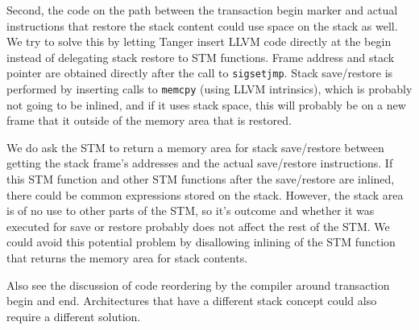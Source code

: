 Second, the code on the path between the transaction begin marker and actual
instructions that restore the stack content could use space on the stack as
well. We try to solve this by letting Tanger insert LLVM code directly at the
begin instead of delegating stack restore to STM functions. Frame
address and stack pointer are obtained directly after the call to
\texttt{sigsetjmp}. Stack save/restore is performed by inserting calls to
\texttt{memcpy} (using LLVM intrinsics), which is probably not going to be
inlined, and if it uses stack space, this will probably be on a new frame that
it outside of the memory area that is restored.

We do ask the STM to return a memory area for stack save/restore between
getting the stack frame's addresses and the actual save/restore instructions.
If this STM function and other STM functions after the save/restore are
inlined, there could be common expressions stored on the stack. However, the
stack area is of no use to other parts of the STM, so it's outcome and
whether it was executed for save or restore probably does not affect the rest
of the STM. We could avoid this potential problem by disallowing inlining of
the STM function that returns the memory area for stack contents.

Also see the discussion of code reordering by the compiler around transaction
begin and end. Architectures that have a different stack concept could also
require a different solution.
